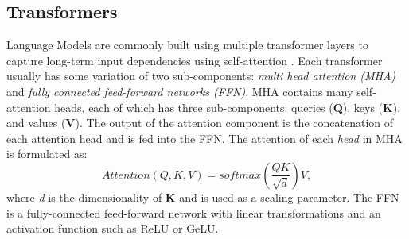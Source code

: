 \subsection{Transformers}
Language Models are commonly built using multiple transformer layers to capture long-term input dependencies using self-attention \cite{Vaswani2017AttentionIA}. Each transformer usually has some variation of two sub-components: \textit{multi head attention (MHA)} and \textit{fully connected feed-forward networks (FFN)}. MHA contains many self-attention heads, each of which has three sub-components: queries (\textbf{Q}), keys (\textbf{K}), and values (\textbf{V}). The output of the attention component is the concatenation of each attention head and is fed into the FFN. 
The attention of each \textit{head} in MHA is formulated as:
\begin{equation}
 Attention(Q,K,V) = \textit{softmax} \left(\frac{QK}{\sqrt{\textit{d}}}\right)V,
 \end{equation}
\noindent where \textit{d} is the dimensionality of \textbf{K} and is used as a scaling parameter. 
The FFN is a fully-connected feed-forward network with linear transformations and an activation function such as ReLU or GeLU. 

